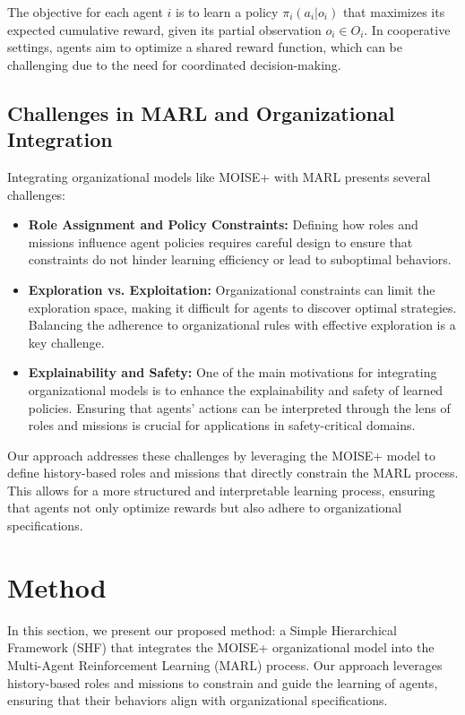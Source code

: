 \documentclass[sigconf,anonymous]{aamas}
\begin{document}
The objective for each agent $i$ is to learn a policy $\pi_i(a_i | o_i)$ that maximizes its expected cumulative reward, given its partial observation $o_i \in O_i$. In cooperative settings, agents aim to optimize a shared reward function, which can be challenging due to the need for coordinated decision-making.

\subsection{Challenges in MARL and Organizational Integration}
Integrating organizational models like MOISE+ with MARL presents several challenges:

\begin{itemize}
    \item \textbf{Role Assignment and Policy Constraints:} Defining how roles and missions influence agent policies requires careful design to ensure that constraints do not hinder learning efficiency or lead to suboptimal behaviors.
    \item \textbf{Exploration vs. Exploitation:} Organizational constraints can limit the exploration space, making it difficult for agents to discover optimal strategies. Balancing the adherence to organizational rules with effective exploration is a key challenge.
    \item \textbf{Explainability and Safety:} One of the main motivations for integrating organizational models is to enhance the explainability and safety of learned policies. Ensuring that agents' actions can be interpreted through the lens of roles and missions is crucial for applications in safety-critical domains.
\end{itemize}

Our approach addresses these challenges by leveraging the MOISE+ model to define history-based roles and missions that directly constrain the MARL process. This allows for a more structured and interpretable learning process, ensuring that agents not only optimize rewards but also adhere to organizational specifications.


\section{Method}
\label{sec:method}

In this section, we present our proposed method: a Simple Hierarchical Framework (SHF) that integrates the MOISE+ organizational model into the Multi-Agent Reinforcement Learning (MARL) process. Our approach leverages history-based roles and missions to constrain and guide the learning of agents, ensuring that their behaviors align with organizational specifications.
\end{document}
